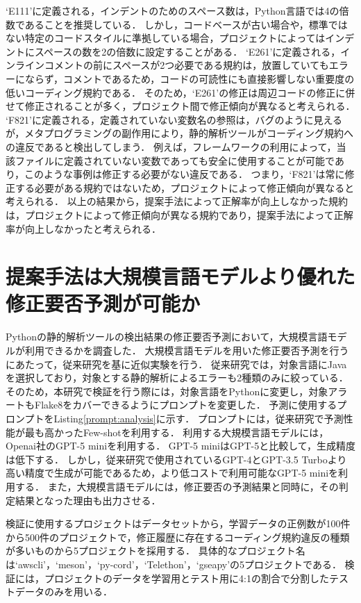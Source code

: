 \documentclass[11pt]{jreport}
\begin{document}
`E111'に定義される，インデントのためのスペース数は，Python言語では4の倍数であることを推奨している．
しかし，コードベースが古い場合や，標準ではない特定のコードスタイルに準拠している場合，プロジェクトによってはインデントにスペースの数を2の倍数に設定することがある．
`E261'に定義される，インラインコメントの前にスペースが2つ必要である規約は，放置していてもエラーにならず，コメントであるため，コードの可読性にも直接影響しない重要度の低いコーディング規約である．
そのため，`E261'の修正は周辺コードの修正に併せて修正されることが多く，プロジェクト間で修正傾向が異なると考えられる．
`F821'に定義される，定義されていない変数名の参照は，バグのように見えるが，メタプログラミングの副作用により，静的解析ツールがコーディング規約への違反であると検出してしまう．
例えば，フレームワークの利用によって，当該ファイルに定義されていない変数であっても安全に使用することが可能であり，このような事例は修正する必要がない違反である．
つまり，`F821'は常に修正する必要がある規約ではないため，プロジェクトによって修正傾向が異なると考えられる．
以上の結果から，提案手法によって正解率が向上しなかった規約は，プロジェクトによって修正傾向が異なる規約であり，提案手法によって正解率が向上しなかったと考えられる．


\section{提案手法は大規模言語モデルより優れた修正要否予測が可能か}

Pythonの静的解析ツールの検出結果の修正要否予測において，大規模言語モデルが利用できるかを調査した．
大規模言語モデルを用いた修正要否予測を行うにあたって，従来研究を基に近似実験を行う\cite{LLMで分類}．
従来研究では，対象言語にJavaを選択しており，対象とする静的解析によるエラーも2種類のみに絞っている．
そのため，本研究で検証を行う際には，対象言語をPythonに変更し，対象アラートもFlake8をカバーできるようにプロンプトを変更した．
予測に使用するプロンプトをListing\ref{prompt:analysis}に示す．
プロンプトには，従来研究で予測性能が最も高かったFew-shotを利用する．
利用する大規模言語モデルには，Openai社のGPT-5 miniを利用する．
GPT-5 miniはGPT-5と比較して，生成精度は低下する．
しかし，従来研究で使用されているGPT-4とGPT-3.5 Turboより高い精度で生成が可能であるため，より低コストで利用可能なGPT-5 miniを利用する．
また，大規模言語モデルには，修正要否の予測結果と同時に，その判定結果となった理由も出力させる．

検証に使用するプロジェクトはデータセットから，学習データの正例数が100件から500件のプロジェクトで，修正履歴に存在するコーディング規約違反の種類が多いものから5プロジェクトを採用する．
具体的なプロジェクト名は`awscli'，`meson'，`py-cord'，`Telethon'，`gseapy'の5プロジェクトである．
検証には，プロジェクトのデータを学習用とテスト用に4:1の割合で分割したテストデータのみを用いる．
\end{document}
